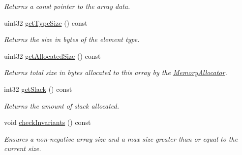 \begin{DoxyCompactItemize}
\begin{DoxyCompactList}\small\item\em Returns a const pointer to the array data. \end{DoxyCompactList}\item 
\mbox{\label{class_arcana_1_1_array_a027f9a11ecfa2c31be32a9746e9ff0d2}} 
uint32 \mbox{\hyperlink{class_arcana_1_1_array_a027f9a11ecfa2c31be32a9746e9ff0d2}{get\+Type\+Size}} () const
\begin{DoxyCompactList}\small\item\em Returns the size in bytes of the element type. \end{DoxyCompactList}\item 
\mbox{\label{class_arcana_1_1_array_a3dc8ca21eebaaaab6a3bc9fe3243dc15}} 
uint32 \mbox{\hyperlink{class_arcana_1_1_array_a3dc8ca21eebaaaab6a3bc9fe3243dc15}{get\+Allocated\+Size}} () const
\begin{DoxyCompactList}\small\item\em Returns total size in bytes allocated to this array by the \mbox{\hyperlink{class_arcana_1_1_memory_allocator}{Memory\+Allocator}}. \end{DoxyCompactList}\item 
\mbox{\label{class_arcana_1_1_array_ac0ffb30e2385e0154b9e50a29ad557cb}} 
int32 \mbox{\hyperlink{class_arcana_1_1_array_ac0ffb30e2385e0154b9e50a29ad557cb}{get\+Slack}} () const
\begin{DoxyCompactList}\small\item\em Returns the amount of slack allocated. \end{DoxyCompactList}\item 
\mbox{\label{class_arcana_1_1_array_aa7971fa123cf15e7466c6795a1d04ed6}} 
void \mbox{\hyperlink{class_arcana_1_1_array_aa7971fa123cf15e7466c6795a1d04ed6}{check\+Invariants}} () const
\begin{DoxyCompactList}\small\item\em Ensures a non-\/negative array size and a max size greater than or equal to the current size. \end{DoxyCompactList}\item 
\mbox{\label{class_arcana_1_1_array_ab457f2db9ded37cbb2db24591eaf173d}} 

\end{DoxyCompactItemize}
